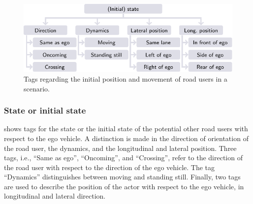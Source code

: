 \documentclass[twoside,twocolumn,9pt]{extarticle}
\theoremstyle{plain}
\begin{document}
\begin{figure}[t!]
	\centering
	\includegraphics{initial_state}
	\caption{Tags regarding the initial position and movement of road users in a scenario.}
	\label{fig:tree initial state}
\end{figure}



\subsubsection{State or initial state}
\label{sec:initial state}

 shows tags for the state or the initial state of the potential other road users with respect to the ego vehicle. A distinction is made in the direction of orientation of the road user, the dynamics, and the longitudinal and lateral position. Three tags, i.e., ``Same as ego'', ``Oncoming'', and ``Crossing'', refer to the direction of the road user with respect to the direction of the ego vehicle. %
The tag ``Dynamics'' distinguishes between moving and standing still. 
Finally, two tags are used to describe the position of the actor with respect to the ego vehicle, in longitudinal and lateral direction. 
\end{document}

